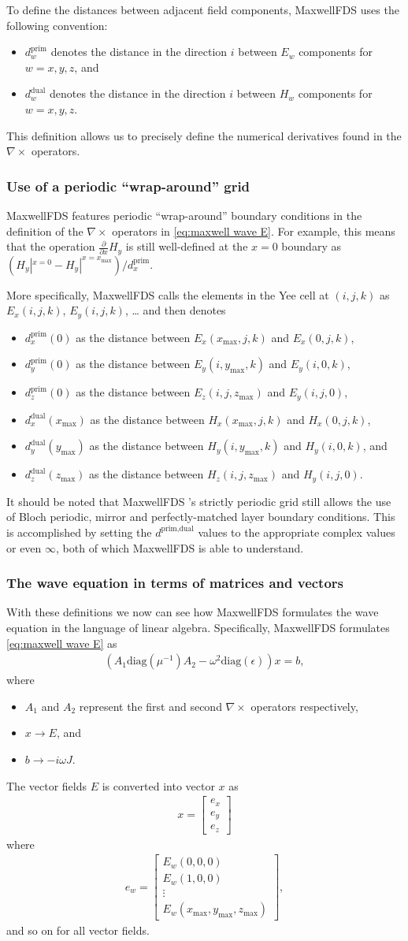 \documentclass{article}
\newcommand{\E}[2]{\begin{align}#2\label{eq:#1}\end{align}}
\newcommand{\curl}{\nabla\times}
\newcommand{\eq}[1]{\eqref{eq:#1}}
\newcommand{\MaxwellFDS}{MaxwellFDS }
\newcommand{\BI}{\begin{itemize}\item}
\newcommand{\EI}{\end{itemize}}
\newcommand{\I}{\item}
\newcommand{\pf}[1]{\frac{\partial}{\partial #1}} %
\newcommand{\prim}{\text{prim}}
\newcommand{\dual}{\text{dual}}
\newcommand{\mx}{\text{max}}
\newcommand{\diag}{\text{diag}}
\begin{document}
To define the distances between adjacent field components,
    \MaxwellFDS uses the following convention:
    \BI $d^\prim_{w}$ denotes the distance in the direction $i$
        between $E_w$ components for $w = x, y, z$, and
    \I  $d^\dual_{w}$ denotes the distance in the direction $i$
        between $H_w$ components for $w = x, y, z$. \EI
This definition allows us to precisely define the numerical derivatives
    found in the $\curl$ operators.
    
\subsubsection{Use of a periodic ``wrap-around'' grid}
\MaxwellFDS features periodic ``wrap-around'' boundary conditions
    in the definition of the $\curl$ operators in \eq{maxwell wave E}.
For example, this means that the operation $\pf{x}H_y$ is still well-defined
    at the $x=0$ boundary as 
    $(H_y|^{x=0} - H_y|^{x = x_\mx}) / d^\prim_x$.

More specifically, \MaxwellFDS calls the elements 
    in the Yee cell at $(i,j,k)$ as $E_x(i,j,k)$, $E_y(i,j,k)$, \ldots 
    and then denotes 
\BI $d^\prim_x(0)$ as the distance 
    between $E_x(x_\mx,j,k)$ and $E_x(0,j,k)$,
\I  $d^\prim_y(0)$ as the distance 
    between $E_y(i,y_\mx,k)$ and $E_y(i,0,k)$,
\I  $d^\prim_z(0)$ as the distance 
    between $E_z(i,j,z_\mx)$ and $E_y(i,j,0)$,
\I  $d^\dual_x(x_\mx)$ as the distance 
    between $H_x(x_\mx,j,k)$ and $H_x(0,j,k)$,
\I  $d^\dual_y(y_\mx)$ as the distance 
    between $H_y(i,y_\mx,k)$ and $H_y(i,0,k)$, and
\I  $d^\dual_z(z_\mx)$ as the distance 
    between $H_z(i,j,z_\mx)$ and $H_y(i,j,0)$. \EI

It should be noted that \MaxwellFDS's strictly periodic grid still
    allows the use of Bloch periodic, mirror and perfectly-matched layer
    boundary conditions.
This is accomplished by setting the $d^{\prim,\dual}$ values to 
    the appropriate complex values or even $\infty$,
    both of which \MaxwellFDS is able to understand.
    
\subsubsection{The wave equation in terms of matrices and vectors}
With these definitions we now can see how \MaxwellFDS
    formulates the wave equation in the language of linear algebra.
Specifically, \MaxwellFDS formulates \eq{maxwell wave E} as
\E  {maxwell wave E discretized}
    {(A_1 \diag(\mu^{-1}) A_2 - \omega^2 \diag(\epsilon)) x = b,}
    where
    \BI $A_1$ and $A_2$ represent the first and second $\curl$ operators
        respectively,
    \I  $x \to E$, and
    \I  $b \to -i \omega J$. \EI

The vector fields $E$ is converted into vector $x$ as
\E{}{x = \begin{bmatrix} e_x \\ e_y \\ e_z \end{bmatrix}}
    where
\E{}{e_w = \begin{bmatrix} E_w(0,0,0) \\ E_w(1,0,0) \\
                        \vdots \\ E_w(x_\mx, y_\mx, z_\mx) \end{bmatrix},}
and so on for all vector fields.
\end{document}
